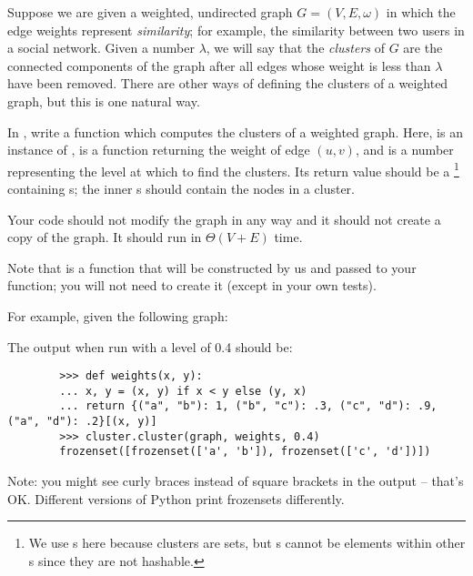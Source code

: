 \begin{progprob}
    Suppose we are given a weighted, undirected graph $G = (V, E, \omega)$ in
    which the edge weights represent \emph{similarity}; for example, the
    similarity between two users in a social network. Given a number $\lambda$,
    we will say that the \emph{clusters} of $G$ are the connected components of
    the graph after all edges whose weight is less than $\lambda$ have been
    removed. There are other ways of defining the clusters of a weighted graph,
    but this is one natural way.

    In , write a function  which computes the clusters of a weighted graph. Here,
     is an instance of ,
     is a function returning the weight of edge $(u, v)$,
    and  is a number representing the level at which to find the
    clusters. Its return value should be a \footnote{
        We use s here because clusters are sets, but s
        cannot be elements within other s since they are not hashable.
    }
    containing s;
    the inner s should contain the nodes in a cluster.

    Your code should not modify the graph in any way and it should not create a copy
    of the graph. It should run in $\Theta(V + E)$ time.

    Note that  is a function that will be constructed by us and
    passed to your function; you will not need to create it (except in your own
    tests).

    For example, given the following graph:


    The output when run with a level of 0.4 should be:

    \begin{verbatim}
        >>> def weights(x, y):
        ... x, y = (x, y) if x < y else (y, x)
        ... return {("a", "b"): 1, ("b", "c"): .3, ("c", "d"): .9, ("a", "d"): .2}[(x, y)]
        >>> cluster.cluster(graph, weights, 0.4)
        frozenset([frozenset(['a', 'b']), frozenset(['c', 'd'])])
    \end{verbatim}

    Note: you might see curly braces instead of square brackets in the output -- that's OK.
    Different versions of Python print frozensets differently.

    \begin{soln}
   \end{soln}

\end{progprob}
